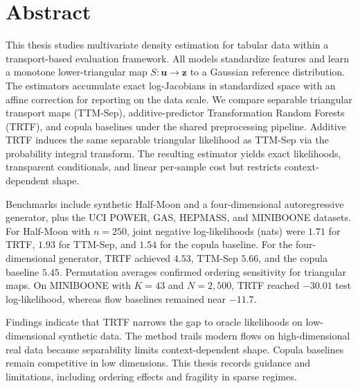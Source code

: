 \documentclass[11pt,a4paper,twoside]{book}\usepackage[]{graphicx}\usepackage[]{xcolor}
\begin{document}





\graphicspath{{./figure/}}
\frontmatter
{}
\setcounter{tocdepth}{1}

\chapter*{Abstract}

This thesis studies multivariate density estimation for tabular data within a transport-based evaluation framework.
All models standardize features and learn a monotone lower-triangular map $S \colon \mathbf{u} \to \mathbf{z}$ to a Gaussian reference distribution.
The estimators accumulate exact log-Jacobians in standardized space with an affine correction for reporting on the data scale.
We compare separable triangular transport maps (TTM-Sep), additive-predictor Transformation Random Forests (TRTF), and copula baselines under the shared preprocessing pipeline.
Additive TRTF induces the same separable triangular likelihood as TTM-Sep via the probability integral transform.
The resulting estimator yields exact likelihoods, transparent conditionals, and linear per-sample cost but restricts context-dependent shape.

Benchmarks include synthetic Half-Moon and a four-dimensional autoregressive generator, plus the UCI POWER, GAS, HEPMASS, and MINIBOONE datasets.
For Half-Moon with $n = 250$, joint negative log-likelihoods (nats) were $1.71$ for TRTF, $1.93$ for TTM-Sep, and $1.54$ for the copula baseline.
For the four-dimensional generator, TRTF achieved $4.53$, TTM-Sep $5.66$, and the copula baseline $5.45$.
Permutation averages confirmed ordering sensitivity for triangular maps.
On MINIBOONE with $K = 43$ and $N = 2{,}500$, TRTF reached $-30.01$ test log-likelihood, whereas flow baselines remained near $-11.7$.

Findings indicate that TRTF narrows the gap to oracle likelihoods on low-dimensional synthetic data.
The method trails modern flows on high-dimensional real data because separability limits context-dependent shape.
Copula baselines remain competitive in low dimensions.
This thesis records guidance and limitations, including ordering effects and fragility in sparse regimes.

\tableofcontents
{}
\end{document}
